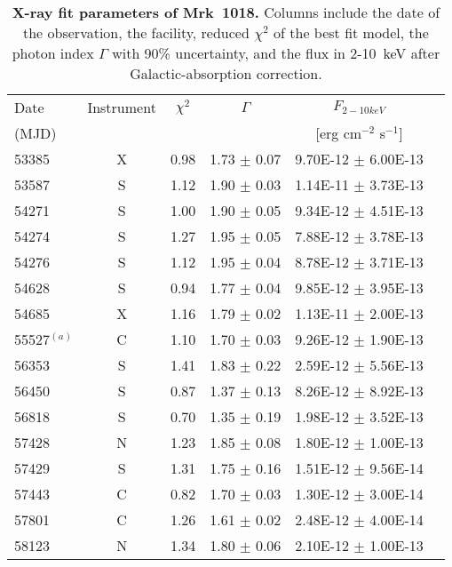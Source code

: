 \begin{table}
\centering
\caption{{ \bf X-ray fit parameters of Mrk~1018. } Columns include the date of the observation, the facility, reduced $\chi ^2$ of the best fit model, the photon index $\Gamma$ with 90\% uncertainty, and the flux in 2-10~keV after Galactic-absorption correction. }
\label{tab:table1}

\begin{tabular}{lccccc}
\hline
\hline
 
  Date   &   Instrument  & $\chi ^2$  &$\Gamma$  &  $F_{2-10keV}$  & \\ 
  (MJD)  &                         &                      &                    &  [erg cm$^{-2}$ s$^{-1}$] &      
 \\  \hline

53385 & X & 0.98 & 1.73  $\pm$  0.07 & 9.70E-12  $\pm$  6.00E-13 &  \\ 
53587 & S & 1.12 & 1.90  $\pm$  0.03 & 1.14E-11  $\pm$  3.73E-13 &  \\ 
54271 & S & 1.00 & 1.90  $\pm$  0.05 & 9.34E-12  $\pm$  4.51E-13 &  \\ 
54274 & S & 1.27 & 1.95  $\pm$  0.05 & 7.88E-12  $\pm$  3.78E-13 &  \\ 
54276 & S & 1.12 & 1.95  $\pm$  0.04 & 8.78E-12  $\pm$  3.71E-13 &  \\ 
54628 & S & 0.94 & 1.77  $\pm$  0.04 & 9.85E-12  $\pm$  3.95E-13 &  \\ 
54685 & X & 1.16 & 1.79  $\pm$  0.02 & 1.13E-11  $\pm$  2.00E-13 &  \\ 
55527$^{(a)}$ & C & 1.10 & 1.70  $\pm$  0.03 & 9.26E-12  $\pm$  1.90E-13 &            \\ 
56353 & S & 1.41 & 1.83  $\pm$  0.22 & 2.59E-12  $\pm$  5.56E-13 &  \\ 
56450 & S & 0.87 & 1.37  $\pm$  0.13 & 8.26E-12  $\pm$  8.92E-13 &  \\ 
56818 & S & 0.70 & 1.35  $\pm$  0.19 & 1.98E-12  $\pm$  3.52E-13 &  \\ 
57428 & N & 1.23 & 1.85  $\pm$  0.08 & 1.80E-12  $\pm$  1.00E-13 &  \\ 
57429 & S & 1.31 & 1.75  $\pm$  0.16 & 1.51E-12  $\pm$  9.56E-14 &  \\ 
57443 & C & 0.82 & 1.70  $\pm$  0.03 & 1.30E-12  $\pm$  3.00E-14 &  \\ 
57801 & C & 1.26 & 1.61  $\pm$  0.02 & 2.48E-12  $\pm$  4.00E-14 &  \\ 
58123 & N & 1.34 & 1.80  $\pm$  0.06 & 2.10E-12  $\pm$  1.00E-13 &  \\ 

\end{tabular}
\end{table}
